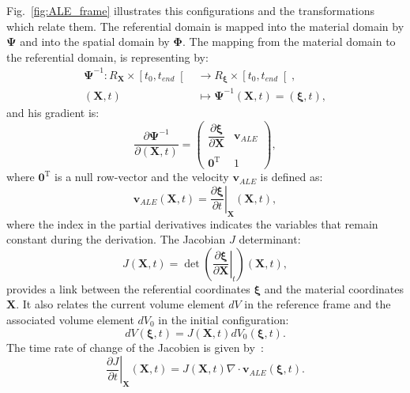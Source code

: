 Fig.~\ref{fig:ALE_frame} illustrates this configurations and the transformations which relate them. The referential domain is mapped into the material domain by $\mathbf{\Psi}$ and into the spatial domain by $\mathbf{\Phi}$.
The mapping from the material domain to the referential domain, is representing by: 
\begin{equation}\label{eq:Psi}
\begin{aligned}
\mathbf{\Psi}^{-1}: R_{\mathbf{X}} \times \left[t_0, t_{end}\right[ & \longrightarrow  R_{\boldsymbol{\xi}} \times \left[t_0, t_{end}\right[, \\
 (\mathbf{X}, t) & \longmapsto  \mathbf{\Psi}^{-1} (\mathbf{X}, t) = (\boldsymbol{\xi}, t),
\end{aligned}
\end{equation}
and his gradient is: 
\begin{equation}
\frac{\partial \mathbf{\Psi}^{-1}}{\partial (\mathbf{X}, t)} =
\begin{pmatrix}
\dfrac{\partial \boldsymbol{\xi}}{\partial \mathbf{X}}  & \mathbf{v}_{ALE}\\
\\
\mathbf{0}^{\operatorname{T}} & {1}
\end{pmatrix}, 
\end{equation}
where $\mathbf{0}^{\operatorname{T}}$ is a null row-vector and the velocity $\mathbf{v}_{ALE}$ is defined as:
\begin{equation}
\mathbf{v}_{ALE}(\mathbf{X},t) =  \left.\dfrac{\partial \boldsymbol{\xi}}{\partial t}\right|_{\mathbf{X}}  (\mathbf{X},t),
\end{equation}
where the index in the partial derivatives indicates the variables that remain constant during the derivation. The Jacobian $J$  determinant: 
\begin{equation}
J (\mathbf{X},t) = \det \left(  \left.\dfrac{\partial \boldsymbol{\xi}}{\partial \mathbf{X}}\right|_{t} \right) (\mathbf{X},t),
\end{equation}
provides a link between the referential coordinates $\boldsymbol{\xi}$ and the material coordinates $\mathbf{X}$. It also relates the current volume element $dV$ in the reference frame and the associated volume element $dV_0$ in the initial configuration: 
\begin{equation}
d V (\boldsymbol{\xi}, t) = J (\mathbf{X}, t) dV_0(\boldsymbol{\xi}, t).
\end{equation}
The time rate of change of the Jacobien is given by~\cite{donea1982arbitrary}:
\begin{equation}\label{eq:jacobien_time_deriv}
\left.\dfrac{\partial J}{\partial t}\right|_{\mathbf{X}}  (\mathbf{X},t) = J (\mathbf{X},t) \nabla \cdot \mathbf{v}_{ALE} (\boldsymbol{\xi}, t ).
\end{equation}

